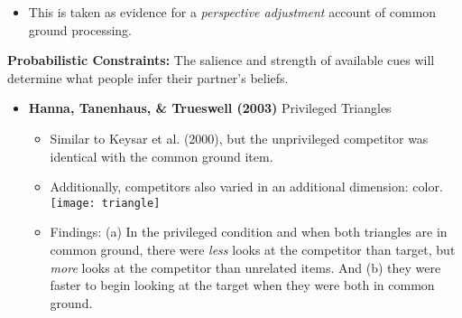 \documentclass{article}
\begin{document}
\begin{multicols}{2}
\begin{itemize}
\begin{itemize}
		\item This is taken as evidence for a \textit{perspective adjustment} account of common ground processing.
	\end{itemize}
\end{itemize}
\textbf{Probabilistic Constraints:} The salience and strength of available cues will determine what people infer their partner's beliefs.
\begin{itemize}
	\item \textbf{Hanna, Tanenhaus, \& Trueswell (2003)} Privileged Triangles
	\begin{itemize}
		\item Similar to Keysar et al. (2000), but the unprivileged competitor was identical with the common ground item.
		\item Additionally, competitors also varied in an additional dimension: color.\\\vspace{2mm}
		\hspace{10.5mm}\texttt{[image: triangle]}
		\item Findings: (a) In the privileged condition and when both triangles are in common ground, there were \textit{less} looks at the competitor than target, but \textit{more} looks at the competitor than unrelated items. And (b) they were faster to begin looking at the target when they were both in common ground.
	\end{itemize} 
\end{itemize}

\end{multicols}
\end{document}
